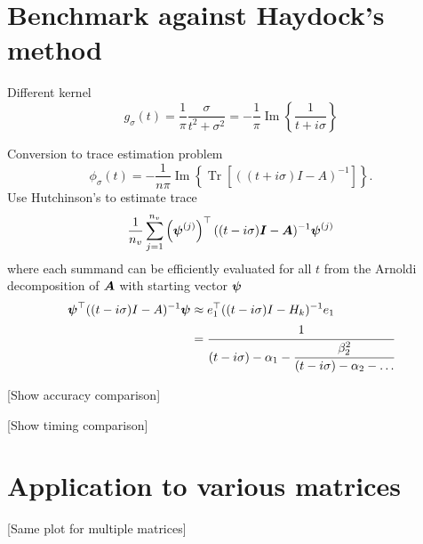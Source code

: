 \section{Benchmark against Haydock's method}
\label{sec:5-experiments-haydock-method}

Different kernel
\begin{equation}
    g_{\sigma}(t) = \frac{1}{\pi} \frac{\sigma}{t^2 + \sigma^2} = -\frac{1}{\pi} \operatorname{Im}\left\{ \frac{1}{t + i\sigma} \right\}
    \label{equ:5-experiments-cauchy-kernel}
\end{equation}

Conversion to trace estimation problem
\begin{equation}
    \phi_{\sigma}(t) = - \frac{1}{n \pi} \operatorname{Im} \left\{ \operatorname{Tr}\left[((t + i\sigma)I - A)^{-1}\right]  \right\}.
    \label{equ:5-experiments-haydock-trace}
\end{equation}
Use Hutchinson's to estimate trace
\begin{equation}
    \frac{1}{n_v} \sum_{j=1}^{n_v} \left( \boldsymbol{\psi}^{(j)} \right)^{\top} ((t - i\sigma)\boldsymbol{I} - \boldsymbol{A})^{-1} \boldsymbol{\psi}^{(j)}
    \label{equ:5-experiments-haydock-hutchinson}
\end{equation}
where each summand can be efficiently evaluated for all $t$ from the Arnoldi decomposition of $\boldsymbol{A}$ with starting vector $\boldsymbol{\psi}$
\begin{align}
    \boldsymbol{\psi}^{\top} ((t - i\sigma)I - A)^{-1} \boldsymbol{\psi} &\approx e_1^{\top} ((t - i\sigma)I - H_k)^{-1} e_1 \notag \\
    &= \cfrac{1}{(t - i\sigma) - \alpha_1 - \cfrac{\beta_2^2}{(t - i\sigma) - \alpha_2 - \dots}}
    \label{equ:5-experiments-haydock-recursion}
\end{align}

[Show accuracy comparison]

[Show timing comparison]

\section{Application to various matrices}
\label{sec:5-experiments-various-matrices}

[Same plot for multiple matrices]
